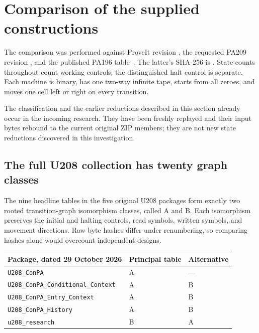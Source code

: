 \section{Comparison of the supplied constructions}

The comparison was performed against ProveIt revision
, the requested PA209
revision , and the
published PA196 table~\cite{pa196,pa209,incoming}. The latter's SHA-256 is
.
State counts throughout count working controls; the distinguished halt
control is separate. Each machine is binary, has one two-way infinite tape,
starts from all zeroes, and moves one cell left or right on every transition.

The classification and the earlier reductions described in this section
already occur in the incoming research. They have been freshly replayed
and their input bytes rebound to the current original ZIP members; they
are not new state reductions discovered in this investigation.

\subsection{The full U208 collection has twenty graph classes}

The nine headline tables in the five original U208 packages form exactly
two rooted transition-graph isomorphism classes, called A and B. Each
isomorphism preserves the initial and halting controls, read symbols,
written symbols, and movement directions. Raw byte hashes differ under
renumbering, so comparing hashes alone would overcount independent designs.

\begin{center}\small
\begin{tabular}{lll}
\hline
Package, dated 29 October 2026 & Principal table & Alternative\\
\hline
\texttt{U208\_ConPA} & A & ---\\
\texttt{U208\_ConPA\_Conditional\_Context} & A & B\\
\texttt{U208\_ConPA\_Entry\_Context} & A & B\\
\texttt{U208\_ConPA\_History} & A & B\\
\texttt{u208\_research} & B & A\\
\hline
\end{tabular}
\end{center}

